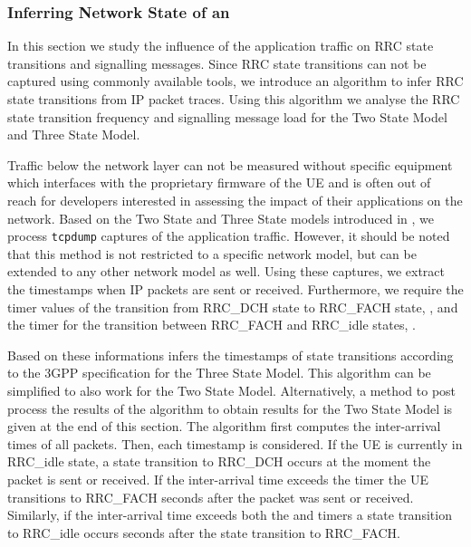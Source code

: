 \subsubsection*{Inferring Network State of an }\label{sec:network:network_traces:performance_evaluation:inferring_network_state}
In this section we study the influence of the application traffic on \gls{RRC} state transitions and signalling messages.
Since \gls{RRC} state transitions can not be captured using commonly available tools, we introduce an algorithm to infer \gls{RRC} state transitions from \gls{IP} packet traces.
Using this algorithm we analyse the \gls{RRC} state transition frequency and signalling message load for the Two State Model and Three State Model.

Traffic below the network layer can not be measured without specific equipment which interfaces with the proprietary firmware of the \gls{UE} and is often out of reach for developers interested in assessing the impact of their applications on the network.
Based on the Two State and Three State models introduced in , we process \texttt{tcpdump} captures of the application traffic.
However, it should be noted that this method is not restricted to a specific network model, but can be extended to any other network model as well.
Using these captures, we extract the timestamps when \gls{IP} packets are sent or received.
Furthermore, we require the timer values of the transition from \gls{RRC_DCH} state to \gls{RRC_FACH} state, \TDCH, and the timer for the transition between \gls{RRC_FACH} and \gls{RRC_idle} states, \TFACH.

Based on these informations  infers the timestamps of state transitions according to the \gls{3GPP} specification \cite{3GPP_RRC_Spec} for the Three State Model.
This algorithm can be simplified to also work for the Two State Model. 
Alternatively, a method to post process the results of the algorithm to obtain results for the Two State Model is given at the end of this section.
The algorithm first computes the inter-arrival times of all packets.
Then, each timestamp is considered.
If the \gls{UE} is currently in \gls{RRC_idle} state, a state transition to \gls{RRC_DCH} occurs at the moment the packet is sent or received.
If the inter-arrival time exceeds the \TDCH timer the \gls{UE} transitions to \gls{RRC_FACH} \TDCH seconds after the packet was sent or received.
Similarly, if the inter-arrival time exceeds both the \TDCH and \TFACH timers a state transition to \gls{RRC_idle} occurs \TDCH seconds after the state transition to \gls{RRC_FACH}.

